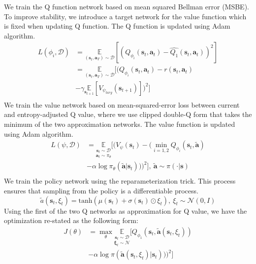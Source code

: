 \documentclass{article}
\begin{document}
We train the Q function network based on mean squared Bellman error (MSBE). To improve stability, we introduce a target network for the value function which is fixed when updating Q function. The Q function is updated using Adam algorithm.
\begin{equation*}
\begin{split}
	L(\phi_i,\mathcal{D}) & = \underset{(\mathbf{s}_t, \mathbf{a}_T) \sim \mathcal{D}}{\mathbb{E}} [ { (Q_{\phi_i} (\mathbf{s}_t, \mathbf{a}_t) - \hat{Q_1} ( \mathbf{s}_t, \mathbf{a}_t ))}^2 ]\\
	& = \underset{(\mathbf{s}_t, \mathbf{a}_T) \sim \mathcal{D}}{\mathbb{E}} [  (Q_{\phi_i} (\mathbf{s}_t, \mathbf{a}_t) - r(\mathbf{s}_t, \mathbf{a}_t)\\
	& - \gamma \underset{\mathbf{s}_{t+1}}{\mathbb{E}} [ V_{\psi_{targ}} ( \mathbf{s}_{t+1} ) ] )^2 ] \\
\end{split}
\end{equation*}
We train the value network based on mean-squared-error loss between current and entropy-adjusted Q value, where we use clipped double-Q form that takes the minimum of the two approximation networks. The value function is updated using Adam algorithm.
\begin{equation*}
\begin{split}
L(\psi,\mathcal{D}) & = \underset{\mathbf{a}_t\sim\pi_\theta}{\underset{\mathbf{s}_t\sim\mathcal{D}}{\mathbb{E}}}  \Big[ (V_\psi(\mathbf{s}_t) - (\min_{i=1,2} Q_{\phi_i}(\mathbf{s}_t, \tilde{\mathbf{a}}) \\
& - \alpha \log\pi_\theta( \tilde{\mathbf{a}} | \mathbf{s}_t)))^2 \Big], \: \tilde{\mathbf{a}} \sim \pi( \cdot | \mathbf{s}) \\
\end{split}
\end{equation*}
We train the policy network using the reparameterization trick. This process ensures that sampling from the policy is a differentiable process. 
$$\tilde{a}(\mathbf{s}_t, \xi_t) = \mathrm{tanh} (\mu(\mathbf{s}_t) + \sigma(\mathbf{s}_t) \odot \xi_t),\: \xi_t \sim \mathcal{N}(0, I)$$
Using the first of the two Q networks as approximation for Q value, we have the optimization re-stated as the following form:
\begin{equation*}
\begin{split}
J(\theta) & = \max_{\theta} \underset{\mathbf{\xi}_t \sim \mathcal{N}}{\underset{\mathbf{s}_t\sim\mathcal{D}}{\mathbb{E}}}  
[ Q_{\phi_1} (\mathbf{s}_t, \tilde{\mathbf{a}} (\mathbf{s}_t, \xi_t))\\
& - \alpha \log \pi ( \tilde{\mathbf{a}} (\mathbf{s}_t, \xi_t) | \mathbf{s}_t)))^2]
\end{split}
\end{equation*}
\end{document}

